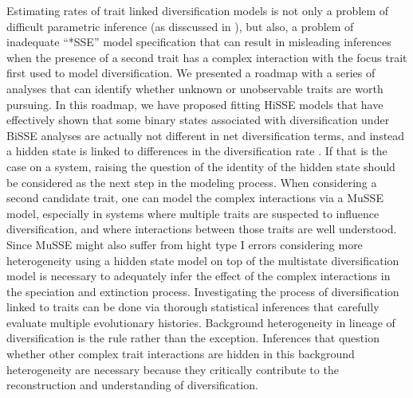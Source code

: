 Estimating rates of trait linked diversification models is not only a problem of difficult parametric inference (as disscussed in  \citet{rabosky_2010, beaulieu_2015}), but also, a problem of inadequate  ``*SSE'' model specification that can result in misleading inferences when the presence of a second trait has a complex interaction with the focus trait first used to model diversification. 
We presented a roadmap with a series of analyses that can identify whether unknown or unobservable traits are worth pursuing. 
In this roadmap, we have proposed fitting HiSSE models that have effectively shown that some binary states associated with diversification under BiSSE analyses are actually not different in net diversification terms, and instead a hidden state is linked to differences in the diversification rate \citep{beaulieu_2016}.  
If that is the case on a system, raising the question of the identity of the hidden state should be considered as the next step in the modeling process. 
When considering  a second candidate trait, one can model the complex interactions via a MuSSE model, especially in systems where multiple traits are suspected to influence diversification, and where interactions between those traits are well understood. 
Since MuSSE might also suffer from hight type I errors considering more heterogeneity using a hidden state model on top of the multistate diversification model is necessary to adequately infer the effect of the complex interactions in the speciation and extinction process.
Investigating the process of diversification linked to traits can be done via thorough statistical inferences that carefully evaluate multiple evolutionary histories. 
Background heterogeneity in lineage of diversification is the rule rather than the exception. Inferences that question whether other complex trait interactions are hidden in this background heterogeneity are necessary because they critically contribute to the reconstruction and understanding of diversification. 